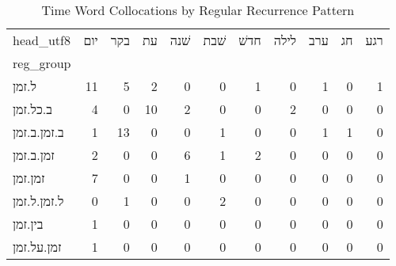 \begin{table}[htbp!]
\centering
\caption{Time Word Collocations by Regular Recurrence Pattern}
\label{table:regrechead_ct}
\begin{tabular}{lrrrrrrrrrr}
\toprule
head\_utf8 &  יום &  בקר &  עת &  שׁנה &  שׁבת &  חדשׁ &  לילה &  ערב &  חג &  רגע \\
reg\_group   &      &      &     &       &       &       &       &      &     &      \\
\midrule
ל.זמן       &   11 &    5 &   2 &     0 &     0 &     1 &     0 &    1 &   0 &    1 \\
ב.כל.זמן    &    4 &    0 &  10 &     2 &     0 &     0 &     2 &    0 &   0 &    0 \\
ב.זמן.ב.זמן &    1 &   13 &   0 &     0 &     1 &     0 &     0 &    1 &   1 &    0 \\
זמן.ב.זמן   &    2 &    0 &   0 &     6 &     1 &     2 &     0 &    0 &   0 &    0 \\
זמן.זמן     &    7 &    0 &   0 &     1 &     0 &     0 &     0 &    0 &   0 &    0 \\
ל.זמן.ל.זמן &    0 &    1 &   0 &     0 &     2 &     0 &     0 &    0 &   0 &    0 \\
בין.זמן     &    1 &    0 &   0 &     0 &     0 &     0 &     0 &    0 &   0 &    0 \\
זמן.על.זמן  &    1 &    0 &   0 &     0 &     0 &     0 &     0 &    0 &   0 &    0 \\
\bottomrule
\end{tabular}
\end{table}
